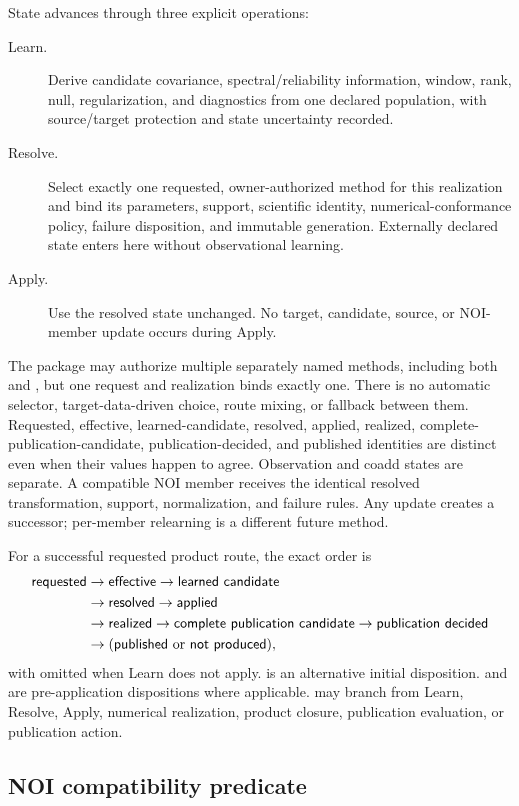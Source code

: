 State advances through three explicit operations:
\begin{description}
\item[Learn.] Derive candidate covariance, spectral/reliability information,
window, rank, null, regularization, and diagnostics from one declared
population, with source/target protection and state uncertainty recorded.
\item[Resolve.] Select exactly one requested, owner-authorized  method
for this realization and bind its
parameters, support, scientific identity, numerical-conformance policy,
failure disposition, and immutable generation. Externally declared state
enters here without observational learning.
\item[Apply.] Use the resolved state unchanged. No target, candidate, source,
or NOI-member update occurs during Apply.
\end{description}
The package may authorize multiple separately named  methods, including
both  and , but one request and realization binds
exactly one. There is no automatic selector, target-data-driven choice, route
mixing, or fallback between them. Requested, effective, learned-candidate,
resolved, applied, realized, complete-publication-candidate,
publication-decided, and published identities
are distinct even when their values happen to agree.
Observation and coadd states are separate. A compatible NOI member receives
the identical resolved transformation, support, normalization, and failure
rules. Any update creates a successor; per-member relearning is a different
future method.

For a successful requested product route, the exact order is
\[
\begin{aligned}
\textsf{requested}&\to\textsf{effective}\to\textsf{learned candidate}\\
&\to\textsf{resolved}\to\textsf{applied}\\
&\to\textsf{realized}\to\textsf{complete publication candidate}\to\textsf{publication decided}\\
&\to(\textsf{published}\ \hbox{or}\ \textsf{not produced}),
\end{aligned}
\]
with \LearnedCandidate{} omitted when Learn does not apply.
\NotRequested{} is an alternative initial disposition. \Disabled{} and
\Unavailable{} are pre-application dispositions where applicable. \Failed{}
may branch from Learn, Resolve, Apply, numerical realization, product closure,
publication evaluation, or publication action.

\subsection{NOI compatibility predicate}
\label{sec:noi-compatibility}

